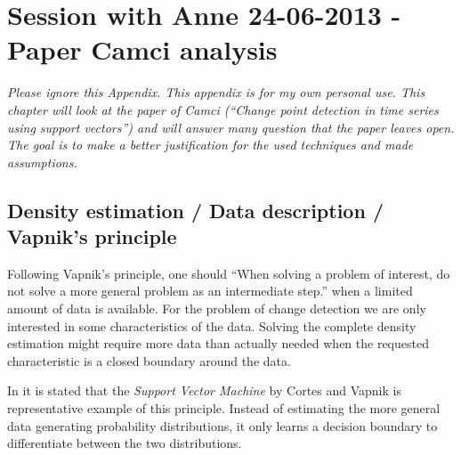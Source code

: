 
\chapter{Session with Anne 24-06-2013 - Paper Camci analysis} %

\label{AppendixB} %


\emph{Please ignore this Appendix.
This appendix is for my own personal use.
This chapter will look at the paper of Camci \cite{camci2010change} (``Change point detection in time series using support vectors'') and will answer many question that the paper leaves open.
The goal is to make a better justification for the used techniques and made assumptions.
}


\section{Density estimation / Data description / Vapnik's principle}
Following Vapnik's principle, one should ``When solving a problem of interest, do not solve a more general problem as an intermediate step.'' \cite{vapnik1998statistical} when a limited amount of data is available.
For the problem of change detection we are only interested in some characteristics of the data.
Solving the complete density estimation might require more data than actually needed when the requested characteristic is a closed boundary around the data.

In \cite{liu2013change} it is stated that the \emph{Support Vector Machine} by Cortes and Vapnik \cite{cortes1995support} is representative example of this principle.
Instead of estimating the more general data generating probability distributions, it only learns a decision boundary to differentiate between the two distributions.

